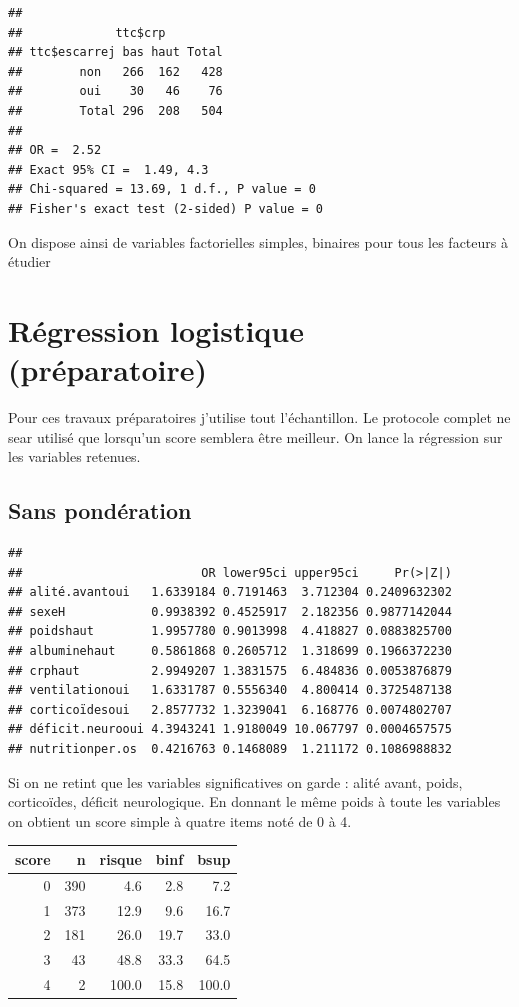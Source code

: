 \documentclass[]{article}
\begin{document}
\begin{verbatim}
## 
##             ttc$crp
## ttc$escarrej bas haut Total
##        non   266  162   428
##        oui    30   46    76
##        Total 296  208   504
## 
## OR =  2.52 
## Exact 95% CI =  1.49, 4.3  
## Chi-squared = 13.69, 1 d.f., P value = 0
## Fisher's exact test (2-sided) P value = 0
\end{verbatim}

On dispose ainsi de variables factorielles simples, binaires pour tous
les facteurs à étudier

\hypertarget{regression-logistique-preparatoire}{%
\section{Régression logistique
(préparatoire)}\label{regression-logistique-preparatoire}}

Pour ces travaux préparatoires j'utilise tout l'échantillon. Le
protocole complet ne sear utilisé que lorsqu'un score semblera être
meilleur. On lance la régression sur les variables retenues.

\hypertarget{sans-ponderation}{%
\subsection{Sans pondération}\label{sans-ponderation}}

\begin{verbatim}
##  
##                         OR lower95ci upper95ci     Pr(>|Z|)
## alité.avantoui   1.6339184 0.7191463  3.712304 0.2409632302
## sexeH            0.9938392 0.4525917  2.182356 0.9877142044
## poidshaut        1.9957780 0.9013998  4.418827 0.0883825700
## albuminehaut     0.5861868 0.2605712  1.318699 0.1966372230
## crphaut          2.9949207 1.3831575  6.484836 0.0053876879
## ventilationoui   1.6331787 0.5556340  4.800414 0.3725487138
## corticoïdesoui   2.8577732 1.3239041  6.168776 0.0074802707
## déficit.neurooui 4.3943241 1.9180049 10.067797 0.0004657575
## nutritionper.os  0.4216763 0.1468089  1.211172 0.1086988832
\end{verbatim}

Si on ne retint que les variables significatives on garde : alité avant,
poids, corticoïdes, déficit neurologique. En donnant le même poids à
toute les variables on obtient un score simple à quatre items noté de 0
à 4.

\begin{longtable}[]{@{}rrrrr@{}}
\toprule
score & n & risque & binf & bsup\tabularnewline
\midrule
\endhead
0 & 390 & 4.6 & 2.8 & 7.2\tabularnewline
1 & 373 & 12.9 & 9.6 & 16.7\tabularnewline
2 & 181 & 26.0 & 19.7 & 33.0\tabularnewline
3 & 43 & 48.8 & 33.3 & 64.5\tabularnewline
4 & 2 & 100.0 & 15.8 & 100.0\tabularnewline
\bottomrule
\end{longtable}
\end{document}
